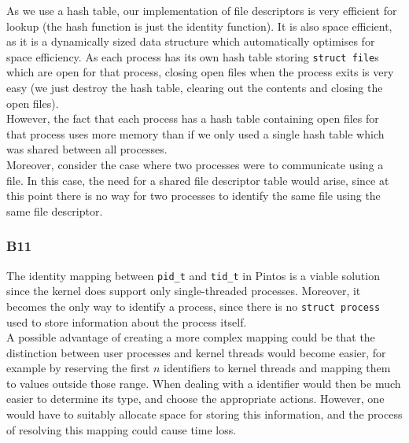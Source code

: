 \documentclass[a4wide, 11pt]{article}
\newcommand{\tx}{\texttt}
\begin{document}
As we use a hash table, our implementation of file descriptors is very efficient for lookup (the hash function is just the identity function). It is also space efficient, as it is a dynamically sized data structure which automatically optimises for space efficiency. As each process has its own hash table storing \tx{struct file}s which are open for that process, closing open files when the process exits is very easy (we just destroy the hash table, clearing out the contents and closing the open files).
\\
However, the fact that each process has a hash table containing open files for that process uses more memory than if we only used a single hash table which was shared between all processes.\\
Moreover, consider the case where two processes were to communicate using a file. In this case, the need for a shared file descriptor table would arise, since at this point there is no way for two processes to identify the same file using the same file descriptor. 

\subsubsection{B11}
The identity mapping between \tx{pid\_t} and \tx{tid\_t} in Pintos is a viable solution since the kernel does support only single-threaded processes. Moreover, it becomes the only way to identify a process, since there is no \tx{struct process} used to store information about the process itself. 
\\ A possible advantage of creating a more complex mapping could be that the distinction between user processes and kernel threads would become easier, for example by reserving the first $n$ identifiers to kernel threads and mapping them to values outside those range. When dealing with a identifier would then be much easier to determine its type, and choose the appropriate actions. However, one would have to suitably allocate space for storing this information, and the process of resolving this mapping could cause time loss.  
\end{document}
